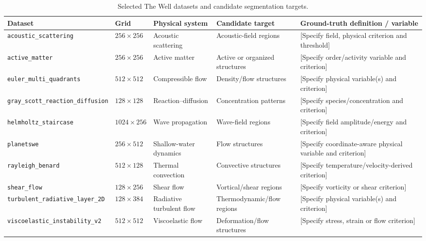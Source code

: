 \documentclass[final,5p,times,twocolumn]{elsarticle}
\begin{document}
\begin{table}[t]
    \centering
    \caption{Selected The Well datasets and candidate segmentation targets.}
    \label{tab:datasets}
    \small
    \begin{tabularx}{\textwidth}{L{3.15cm} L{1.65cm} L{2.35cm} Y Y}
        \toprule
        \textbf{Dataset} & \textbf{Grid} & \textbf{Physical system} &
        \textbf{Candidate target} & \textbf{Ground-truth definition / variable} \\
        \midrule
        \texttt{acoustic\_scattering} & $256\times256$ & Acoustic scattering &
        Acoustic-field regions & [Specify field, physical criterion and threshold] \\
        \addlinespace
        \texttt{active\_matter} & $256\times256$ & Active matter &
        Active or organized structures & [Specify order/activity variable and criterion] \\
        \addlinespace
        \texttt{euler\_multi\_quadrants} & $512\times512$ & Compressible flow &
        Density/flow structures & [Specify physical variable(s) and criterion] \\
        \addlinespace
        \texttt{gray\_scott\_reaction\_diffusion} & $128\times128$ & Reaction--diffusion &
        Concentration patterns & [Specify species/concentration and criterion] \\
        \addlinespace
        \texttt{helmholtz\_staircase} & $1024\times256$ & Wave propagation &
        Wave-field regions & [Specify field amplitude/energy and criterion] \\
        \addlinespace
        \texttt{planetswe} & $256\times512$ & Shallow-water dynamics &
        Flow structures & [Specify coordinate-aware physical variable and criterion] \\
        \addlinespace
        \texttt{rayleigh\_benard} & $512\times128$ & Thermal convection &
        Convective structures & [Specify temperature/velocity-derived criterion] \\
        \addlinespace
        \texttt{shear\_flow} & $128\times256$ & Shear flow &
        Vortical/shear regions & [Specify vorticity or shear criterion] \\
        \addlinespace
        \texttt{turbulent\_radiative\_layer\_2D} & $128\times384$ & Radiative turbulent flow &
        Thermodynamic/flow regions & [Specify physical variable(s) and criterion] \\
        \addlinespace
        \texttt{viscoelastic\_instability\_v2} & $512\times512$ & Viscoelastic flow &
        Deformation/flow structures & [Specify stress, strain or flow criterion] \\
        \bottomrule
    \end{tabularx}
\end{table}
\end{document}
